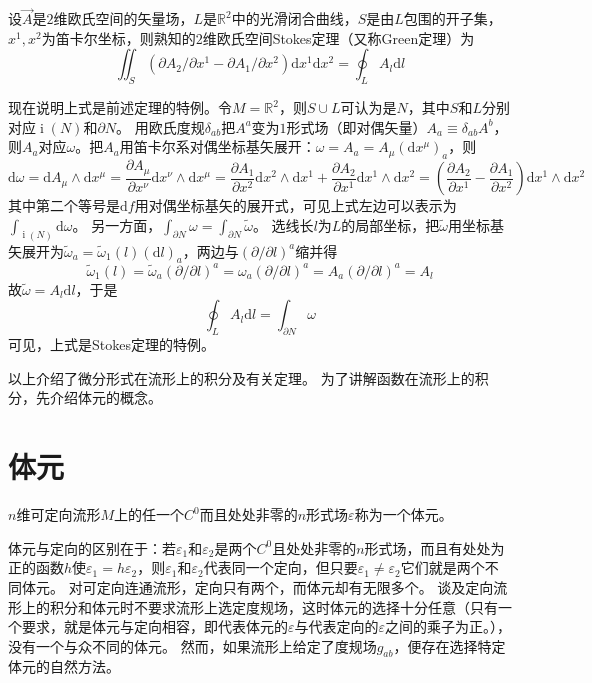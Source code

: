 \begin{example}
    设$\vec{A}$是$2$维欧氏空间的矢量场，$L$是$\mathbb{R}^2$中的光滑闭合曲线，$S$是由$L$包围的开子集，$x^1, x^2$为笛卡尔坐标，则熟知的$2$维欧氏空间Stokes定理（又称Green定理）为
    $$\iint_S(\partial A_2 / \partial x^1 - \partial A_1 / \partial x^2)\mathrm{d}x^1\mathrm{d}x^2 = \oint_LA_l\mathrm{d}l$$

    现在说明上式是前述定理的特例。令$M = \mathbb{R}^2$，则$S \cup L$可认为是$N$，其中$S$和$L$分别对应$\operatorname{i}(N)$和$\partial N$。
    用欧氏度规$\delta_{ab}$把$A^a$变为$1$形式场（即对偶矢量）$A_a \equiv \delta_{ab}A^b$，则$A_a$对应$\omega$。把$A_a$用笛卡尔系对偶坐标基矢展开：$\omega = A_a = A_\mu(\mathrm{d}x^\mu)_a$，则
    $$\mathrm{d}\omega = \mathrm{d}A_\mu \wedge \mathrm{d}x^\mu = \frac{\partial A_\mu}{\partial x^\nu}\mathrm{d}x^\nu \wedge \mathrm{d}x^\mu = \frac{\partial A_1}{\partial x^2}\mathrm{d}x^2 \wedge \mathrm{d}x^1 + \frac{\partial A_2}{\partial x^1}\mathrm{d}x^1 \wedge \mathrm{d}x^2 = (\frac{\partial A_2}{\partial x^1} - \frac{\partial A_1}{\partial x^2})\mathrm{d}x^1 \wedge \mathrm{d}x^2$$
    其中第二个等号是$\mathrm{d}f$用对偶坐标基矢的展开式，可见上式左边可以表示为$\displaystyle\int_{\operatorname{i}(N)}\mathrm{d}\omega$。
    另一方面，$\displaystyle\int_{\partial N}\omega = \int_{\partial N}\tilde\omega$。
    选线长$l$为$L$的局部坐标，把$\tilde\omega$用坐标基矢展开为$\tilde\omega_a = \tilde\omega_1(l)(\mathrm{d}l)_a$，两边与$(\partial / \partial l)^a$缩并得
    $$\tilde\omega_1(l) = \tilde\omega_a(\partial / \partial l)^a = \omega_a(\partial / \partial l)^a = A_a(\partial / \partial l)^a = A_l$$
    故$\tilde\omega = A_l\mathrm{d}l$，于是
    $$\oint_L A_l\mathrm{d}l = \int_{\partial N}\omega$$
    可见，上式是Stokes定理的特例。
\end{example}

以上介绍了微分形式在流形上的积分及有关定理。
为了讲解函数在流形上的积分，先介绍体元的概念。

\section{体元}

\begin{definition}
    $n$维可定向流形$M$上的任一个$C^0$而且处处非零的$n$形式场$\varepsilon$称为一个体元。
\end{definition}

\begin{note}
    体元与定向的区别在于：若$\varepsilon_1$和$\varepsilon_2$是两个$C^0$且处处非零的$n$形式场，而且有处处为正的函数$h$使$\varepsilon_1 = h \varepsilon_2$，则$\varepsilon_1$和$\varepsilon_2$代表同一个定向，但只要$\varepsilon_1 \neq \varepsilon_2$它们就是两个不同体元。
    对可定向连通流形，定向只有两个，而体元却有无限多个。
    谈及定向流形上的积分和体元时不要求流形上选定度规场，这时体元的选择十分任意（只有一个要求，就是体元与定向相容，即代表体元的$\varepsilon$与代表定向的$\varepsilon$之间的乘子为正。），没有一个与众不同的体元。
    然而，如果流形上给定了度规场$g_{ab}$，便存在选择特定体元的自然方法。
\end{note}

